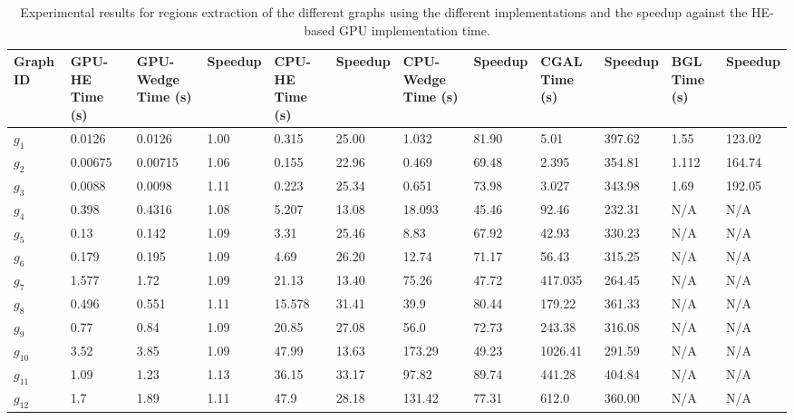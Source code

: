 \documentclass[conference]{IEEEtran}
\begin{document}
\begin{table}[t]
\centering
\small %
\begin{tabularx}{\textwidth}{|l|>{\columncolor[gray]{0.9}}X|X|X|>{\columncolor[gray]{0.9}}X|X|X|X|X|X|X|X|}
\hline
\textbf{Graph ID} & \textbf{GPU-HE Time (s)} & \textbf{GPU-Wedge Time (s)} & \textbf{Speedup} & \textbf{CPU-HE Time (s)} & \textbf{Speedup} & \textbf{CPU-Wedge Time (s)} & \textbf{Speedup} & \textbf{CGAL Time (s)} & \textbf{Speedup} & \textbf{BGL Time (s)} & \textbf{Speedup} \\
\hline
\(g_1\) & 0.0126 & 0.0126 & 1.00 & 0.315 & 25.00 & 1.032 & 81.90 & 5.01 & 397.62 & 1.55 & 123.02 \\
\hline
\(g_2\) & 0.00675 & 0.00715 & 1.06 & 0.155 & 22.96 & 0.469 & 69.48 & 2.395 & 354.81 & 1.112 & 164.74 \\
\hline
\(g_3\) & 0.0088 & 0.0098 & 1.11 & 0.223 & 25.34 & 0.651 & 73.98 & 3.027 & 343.98 & 1.69 & 192.05 \\
\hline
\(g_4\) & 0.398 & 0.4316 & 1.08 & 5.207 & 13.08 & 18.093 & 45.46 & 92.46 & 232.31 & N/A & N/A \\
\hline
\(g_5\) & 0.13 & 0.142 & 1.09 & 3.31 & 25.46 & 8.83 & 67.92 & 42.93 & 330.23 & N/A & N/A \\
\hline
\(g_6\) & 0.179 & 0.195 & 1.09 & 4.69 & 26.20 & 12.74 & 71.17 & 56.43 & 315.25 & N/A & N/A \\
\hline
\(g_7\) & 1.577 & 1.72 & 1.09 & 21.13 & 13.40 & 75.26 & 47.72 & 417.035 & 264.45 & N/A & N/A \\
\hline
\(g_8\) & 0.496 & 0.551 & 1.11 & 15.578 & 31.41 & 39.9 & 80.44 & 179.22 & 361.33 & N/A & N/A \\
\hline
\(g_9\) & 0.77 & 0.84 & 1.09 & 20.85 & 27.08 & 56.0 & 72.73 & 243.38 & 316.08 & N/A & N/A \\
\hline
\(g_{10}\) & 3.52 & 3.85 & 1.09 & 47.99 & 13.63 & 173.29 & 49.23 & 1026.41 & 291.59 & N/A & N/A \\
\hline
\(g_{11}\) & 1.09 & 1.23 & 1.13 & 36.15 & 33.17 & 97.82 & 89.74 & 441.28 & 404.84 & N/A & N/A \\
\hline
\(g_{12}\) & 1.7 & 1.89 & 1.11 & 47.9 & 28.18 & 131.42 & 77.31 & 612.0 & 360.00 & N/A & N/A \\
\hline
\end{tabularx}
\caption{Experimental results for regions extraction of the different graphs using the different implementations and the speedup against the HE-based GPU implementation time.}
\label{tab:results}
\end{table}
\end{document}
